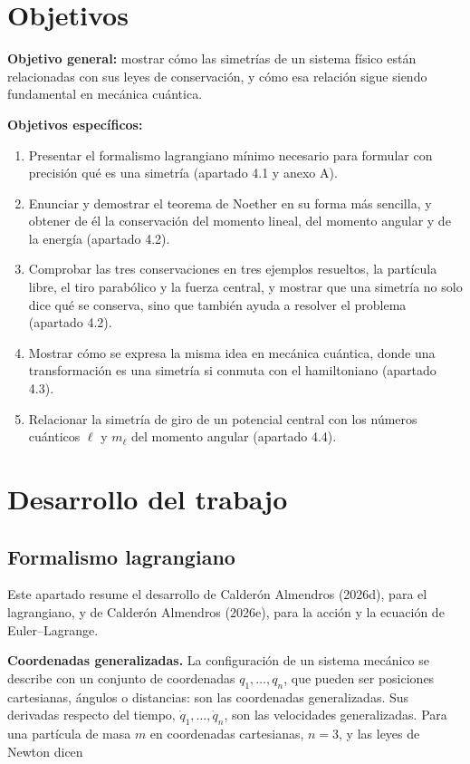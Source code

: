\documentclass[11pt,a4paper,spanish]{book}
\providecommand{\tightlist}{%
  \setlength{\itemsep}{0pt}\setlength{\parskip}{0pt}}
\begin{document}
\chapter{Objetivos}\label{objetivos}

\textbf{Objetivo general:} mostrar cómo las simetrías de un sistema
físico están relacionadas con sus leyes de conservación, y cómo esa
relación sigue siendo fundamental en mecánica cuántica.

\textbf{Objetivos específicos:}

\begin{enumerate}
\def\labelenumi{\arabic{enumi}.}
\tightlist
\item
  Presentar el formalismo lagrangiano mínimo necesario para formular con
  precisión qué es una simetría (apartado 4.1 y anexo A).
\item
  Enunciar y demostrar el teorema de Noether en su forma más sencilla, y
  obtener de él la conservación del momento lineal, del momento angular
  y de la energía (apartado 4.2).
\item
  Comprobar las tres conservaciones en tres ejemplos resueltos, la
  partícula libre, el tiro parabólico y la fuerza central, y mostrar que
  una simetría no solo dice qué se conserva, sino que también ayuda a
  resolver el problema (apartado 4.2).
\item
  Mostrar cómo se expresa la misma idea en mecánica cuántica, donde una
  transformación es una simetría si conmuta con el hamiltoniano
  (apartado 4.3).
\item
  Relacionar la simetría de giro de un potencial central con los números
  cuánticos \(\ell\) y \(m_\ell\) del momento angular (apartado 4.4).
\end{enumerate}

\chapter{Desarrollo del trabajo}\label{desarrollo-del-trabajo}

\section{Formalismo lagrangiano}\label{formalismo-lagrangiano}

Este apartado resume el desarrollo de Calderón Almendros (2026d), para
el lagrangiano, y de Calderón Almendros (2026e), para la acción y la
ecuación de Euler--Lagrange.

\textbf{Coordenadas generalizadas.} La configuración de un sistema
mecánico se describe con un conjunto de coordenadas \(q_1, \dots, q_n\),
que pueden ser posiciones cartesianas, ángulos o distancias: son las
coordenadas generalizadas. Sus derivadas respecto del tiempo,
\(\dot{q}_1, \dots, \dot{q}_n\), son las velocidades generalizadas. Para
una partícula de masa \(m\) en coordenadas cartesianas, \(n = 3\), y las
leyes de Newton dicen
\end{document}
